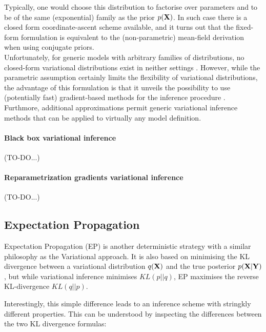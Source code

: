 Typically, one would choose this distribution to factorise over parameters and to be of the same (exponential) family as the prior $p({\bf X})$. In such case there is a closed form coordinate-ascent scheme available, and it turns out that the fixed-form formulation is equivalent to the (non-parametric) mean-field derivation when using conjugate priors.\\
Unfortunately, for generic models with arbitrary families of distributions, no closed-form variational distributions exist in neither settings \cite{Zhang2017,Blei2016}. However, while the parametric assumption certainly limits the flexibility of variational distributions, the advantage of this formulation is that it unveils the possibility to use (potentially fast) gradient-based methods for the inference procedure \cite{Hoffman2012,Ranganath2014,Platt2008}.\\
Furthmore, additional approximations permit generic variational inference methods that can be applied to virtually any model definition\cite{Zhang2017,Blei2016}.

\paragraph{Black box variational inference}
(TO-DO...)

\paragraph{Reparametrization gradients variational inference}
(TO-DO...)


\subsection{Expectation Propagation}  \label{section:expectation_propagation}
Expectation Propagation (EP) is another deterministic strategy with a similar philosophy as the Variational approach. It is also based on minimising the KL divergence between a variational distribution $q({\bf X})$ and the true posterior $p({\bf X}|{\bf Y})$, but while variational inference minimises $KL(p||q)$, EP maximises the reverse KL-divergence $KL(q||p)$.

Interestingly, this simple difference leads to an inference scheme with stringkly different properties. This can be understood by inspecting the differences between the two KL divergence formulas:

